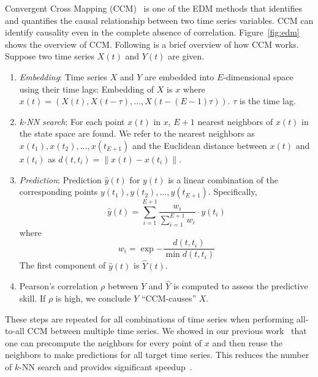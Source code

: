 \documentclass[conference]{IEEEtran}
\begin{document}
Convergent Cross Mapping (CCM)~\cite{Sugihara2012} is one of the EDM methods
that identifies and quantifies the causal relationship between two time series
variables. CCM can identify causality even in the complete absence of
correlation. Figure~\ref{fig:edm} shows the overview of CCM\@. Following is a
brief overview of how CCM works. Suppose two time series $X(t)$ and $Y(t)$ are
given.

\begin{enumerate}
    \item \textit{Embedding}: Time series $X$ and $Y$ are embedded into
        $E$-dimensional space using their time lags: Embedding of $X$ is $x$
        where $x(t)=\left(X(t), X(t-\tau), \dots, X(t-(E-1) \tau)\right)$.
        $\tau$ is the time lag.
    \item \textit{k-NN search}: For each point $x(t)$ in $x$, $E+1$ nearest
        neighbors of $x(t)$ in the state space are found. We refer to the
        nearest neighbors as $x(t_1), x(t_2), \dots, x(t_{E+1})$ and the
        Euclidean distance between $x(t)$ and $x(t_i)$ as $d(t, t_i)=\lVert
        x(t) - x(t_i) \rVert$.
    \item \textit{Prediction}: Prediction $\hat{y}(t)$ for $y(t)$ is a linear
        combination of the corresponding points $y(t_1), y(t_2), \dots,
        y(t_{E+1})$. Specifically,
        \begin{equation*}
            \hat{y}(t) = \sum^{E+1}_{i=1} \frac{w_i}{\sum^{E+1}_{i=1}{w_i}} \cdot y(t_i)
        \end{equation*}
        where
        \begin{equation*}
            w_i = \exp{-\frac{d(t, t_i)}{\min{d(t, t_i)}}}
        \end{equation*}
        The first component of $\hat{y}(t)$ is $\hat{Y}(t)$.
    \item Pearson's correlation $\rho$ between $Y$ and $\hat{Y}$ is computed
        to assess the predictive skill. If $\rho$ is high, we conclude $Y$
        ``CCM-causes'' $X$.
\end{enumerate}

These steps are repeated for all combinations of time series when performing
all-to-all CCM between multiple time series. We showed in our previous
work~\cite{mpedm} that one can precompute the neighbors for every point of $x$
and then reuse the neighbors to make predictions for all target time series.
This reduces the number of $k$-NN search and provides significant
speedup~\cite{mpedm}.
\end{document}
